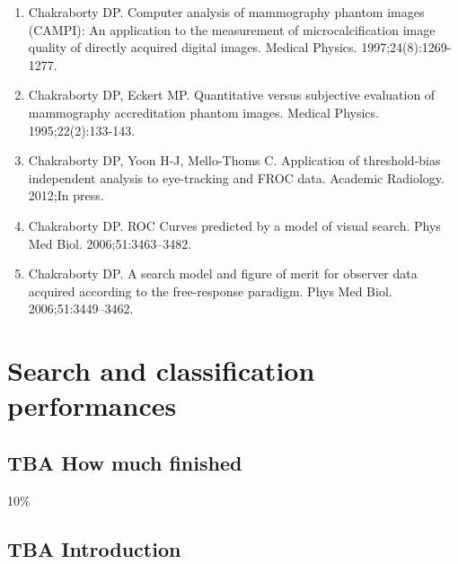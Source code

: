 \documentclass[
]{book}
\providecommand{\tightlist}{%
  \setlength{\itemsep}{0pt}\setlength{\parskip}{0pt}}
\begin{document}
\begin{enumerate}
\def\labelenumi{\arabic{enumi}.}
\tightlist
\item
  Chakraborty DP. Computer analysis of mammography phantom images (CAMPI): An application to the measurement of microcalcification image quality of directly acquired digital images. Medical Physics. 1997;24(8):1269-1277.
\item
  Chakraborty DP, Eckert MP. Quantitative versus subjective evaluation of mammography accreditation phantom images. Medical Physics. 1995;22(2):133-143.
\item
  Chakraborty DP, Yoon H-J, Mello-Thoms C. Application of threshold-bias independent analysis to eye-tracking and FROC data. Academic Radiology. 2012;In press.
\item
  Chakraborty DP. ROC Curves predicted by a model of visual search. Phys Med Biol. 2006;51:3463--3482.
\item
  Chakraborty DP. A search model and figure of merit for observer data acquired according to the free-response paradigm. Phys Med Biol. 2006;51:3449--3462.
\end{enumerate}

\hypertarget{rsm-sc}{%
\chapter{Search and classification performances}\label{rsm-sc}}

\hypertarget{rsm-sc-how-much-finished}{%
\section{TBA How much finished}\label{rsm-sc-how-much-finished}}

10\%

\hypertarget{rsm-sc-intro}{%
\section{TBA Introduction}\label{rsm-sc-intro}}
\end{document}
